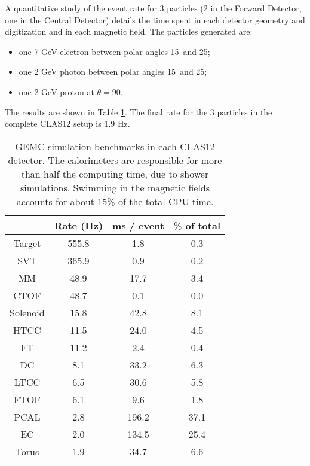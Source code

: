 A quantitative study of the event rate for 3 particles (2 in the Forward Detector, one in the Central Detector)
details the time spent in each detector geometry and digitization and in each magnetic field.
The particles generated are:

\begin{itemize}
	\item one 7 GeV electron between polar angles 15\mdeg \ and 25\mdeg;
	\item one 2 GeV photon between polar angles 15\mdeg \ and 25\mdeg;
	\item one 2 GeV proton at $\theta=$90\mdeg.
\end{itemize}

The results are shown in Table \ref{tab:benchmarks}. The final rate for the 3 particles in the
complete CLAS12 setup is 1.9 Hz.

\begin{table}[h]
	\begin{center}
		\begin{tabular}{ c | c | c | c }
			 \hline \hline
			 & Rate (Hz) &  ms / event &  $\%$ of total\\
			\hline
Target   &  555.8  &   1.8   & 0.3  \\
SVT      &  365.9  &   0.9   & 0.2  \\
MM       &  48.9   &   17.7  & 3.4  \\
CTOF     &  48.7   &   0.1   & 0.0  \\
Solenoid &  15.8   &   42.8  & 8.1  \\
HTCC     &  11.5   &   24.0  & 4.5  \\
FT       &  11.2   &   2.4   & 0.4  \\
DC       &  8.1    &   33.2  & 6.3  \\
LTCC     &  6.5    &   30.6  & 5.8  \\
FTOF     &  6.1    &   9.6   & 1.8  \\
PCAL     &  2.8    &   196.2 & 37.1 \\
EC       &  2.0    &   134.5 & 25.4 \\
Torus    &  1.9    &   34.7  & 6.6  \\
		\hline \hline
		\end{tabular}
	\end{center}
	\caption{GEMC simulation benchmarks in each CLAS12 detector. The calorimeters are responsible for more than
             half the computing time, due to shower simulations. Swimming in the magnetic fields accounts for about 15$\%$ of the total CPU time.}
\label{tab:benchmarks}
\end{table}

